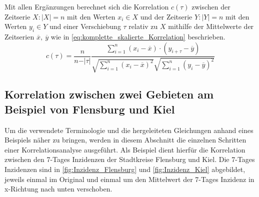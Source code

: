 Mit allen Ergänzungen berechnet sich die Korrelation $c(\tau)$ zwischen der Zeitserie $X:|X|=n$ mit den Werten $x_i\in X$ und der Zeitserie $Y:|Y|=n$ mit den Werten $y_i \in Y$ und einer Verschiebung $\tau$ relativ zu $X$ mithilfe der Mittelwerte der Zeitserien $\overline x,\ \overline y$ wie in \autoref{eq:komplette_skalierte_Korrelation} beschrieben.
\begin{equation}\label{eq:komplette_skalierte_Korrelation}
    c(\tau) =\frac{n}{n-\vert\tau\vert}
    \frac{\sum_{i=1}^n (x_i-\overline x)\cdot (y_{i+\tau}-\overline y)}{\sqrt{\sum_{i=1}^n (x_i-\overline x)^2}\sqrt{\sum_{i=1}^n (y_i-\overline y)^2}}
\end{equation}

\subsection{Korrelation zwischen zwei Gebieten am Beispiel von Flensburg und Kiel}
Um die verwendete Terminologie und die hergeleiteten Gleichungen anhand eines Beispiels näher zu bringen, werden in diesem Abschnitt die einzelnen Schritten einer Korrelationsanalyse ausgeführt. Als Beispiel dient hierfür die Korrelation zwischen den 7-Tages Inzidenzen der Stadtkreise Flensburg und Kiel. Die 7-Tages Inzidenzen sind in \autoref{fig:Inzidenz_Flensburg} und \autoref{fig:Inzidenz_Kiel} abgebildet, jeweils einmal im Original und einmal um den Mittelwert der 7-Tages Inzidenz in x-Richtung nach unten verschoben.

